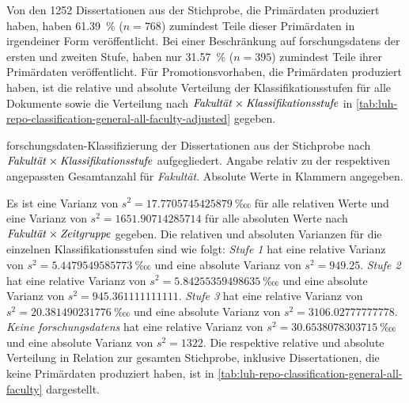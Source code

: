 Von den \num{1252} Dissertationen aus der Stichprobe, die Primärdaten produziert haben, haben \SI{61,39}{\percent} ($n=\num{768}$) zumindest Teile dieser Primärdaten in irgendeiner Form veröffentlicht.
Bei einer Beschränkung auf \glspl{forschungsdaten} der ersten und zweiten Stufe, haben nur \SI{31,57}{\percent} ($n=\num{395}$) zumindest Teile ihrer Primärdaten veröffentlicht.
Für Promotionsvorhaben, die Primärdaten produziert haben, ist die relative und absolute Verteilung der Klassifikationsstufen für alle Dokumente sowie die Verteilung nach $\text{\textit{Fakultät}}\times\text{\textit{Klassifikationsstufe}}$ in \cref{tab:luh-repo-classification-general-all-faculty-adjusted} gegeben.
\begin{table}[!htbp]
	\caption{\gls{forschungsdaten}-Klassifizierung der Dissertationen aus der Stichprobe nach $\text{\textit{Fakultät}}\times\text{\textit{Klassifikationsstufe}}$ aufgegliedert.
    Angabe relativ zu der respektiven angepassten Gesamtanzahl für \textit{Fakultät}.
    Absolute Werte in Klammern angegeben.}
    
    \label{tab:luh-repo-classification-general-all-faculty-adjusted}
\end{table}
Es ist eine Varianz von $s^2=\SI[round-mode=places,round-precision=3]{17.7705745425879}{‱}$ für alle relativen Werte und eine Varianz von $s^2=\num[round-mode=places,round-precision=3]{1651.90714285714}$ für alle absoluten Werte nach $\text{\textit{Fakultät}}\times\text{\textit{Zeitgruppe}}$ gegeben.
Die relativen und absoluten Varianzen für die einzelnen Klassifikationsstufen sind wie folgt:
\textit{Stufe 1} hat eine relative Varianz von $s^2=\SI[round-mode=places,round-precision=3]{5.4479549585773}{‱}$ und eine absolute Varianz von $s^2=\num[round-mode=places,round-precision=3]{949.25}$.
\textit{Stufe 2} hat eine relative Varianz von $s^2=\SI[round-mode=places,round-precision=3]{5.84255359498635}{‱}$ und eine absolute Varianz von $s^2=\num[round-mode=places,round-precision=3]{945.361111111111}$.
\textit{Stufe 3} hat eine relative Varianz von $s^2=\SI[round-mode=places,round-precision=3]{20.381490231776}{‱}$ und eine absolute Varianz von $s^2=\num[round-mode=places,round-precision=3]{3106.02777777778}$.
\textit{Keine \glspl{forschungsdaten}} hat eine relative Varianz von $s^2=\SI[round-mode=places,round-precision=3]{30.6538078303715}{‱}$ und eine absolute Varianz von $s^2=\num[round-mode=places,round-precision=3]{1322}$.
Die respektive relative und absolute Verteilung in Relation zur gesamten Stichprobe, inklusive Dissertationen, die keine Primärdaten produziert haben, ist in \cref{tab:luh-repo-classification-general-all-faculty} dargestellt.
